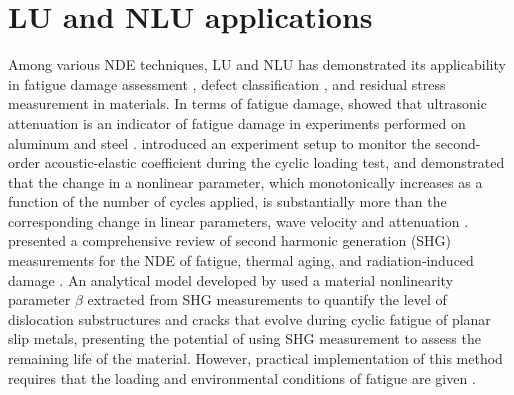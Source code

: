 \section{LU and NLU applications}
Among various NDE techniques, LU and NLU has demonstrated its applicability in fatigue damage assessment \cite{nde-lu-fatigue-JOSHI1972577, nde-nlu-fatigue-NAGY1998375,nde-nlu-review-Matlack2014, nde-nlu-fatigue-Cantrell}, defect classification \cite{nde-lu-ml-defect-Sambath2011,nde-lu-ml-defect-s19194216}, and residual stress measurement \cite{nde-lu-rs-Man1987,nde-lu-rs-TANALA199583,nde-lu-rs-LIU2018178} in materials. In terms of fatigue damage,  showed that ultrasonic attenuation is an indicator of fatigue damage in experiments performed on aluminum and steel \cite{nde-lu-fatigue-JOSHI1972577}.  introduced an experiment setup to monitor the second-order acoustic-elastic coefficient during the cyclic loading test, and demonstrated that the change in a nonlinear parameter, which monotonically increases as a function of the number of cycles applied, is substantially more than the corresponding change in linear parameters, wave velocity and attenuation \cite{nde-nlu-fatigue-NAGY1998375}.  presented a comprehensive review of second harmonic generation (SHG) measurements for the NDE of fatigue, thermal aging, and radiation‐induced damage \cite{nde-nlu-review-Matlack2014}. An analytical model developed by  used a material nonlinearity parameter $ \beta $ extracted from SHG measurements to quantify the level of dislocation substructures and cracks that evolve during cyclic fatigue of planar slip metals, presenting the potential of using SHG measurement to assess the remaining life of the material. However, practical implementation of this method requires that the loading and environmental conditions of fatigue are given \cite{nde-nlu-fatigue-Cantrell}.

